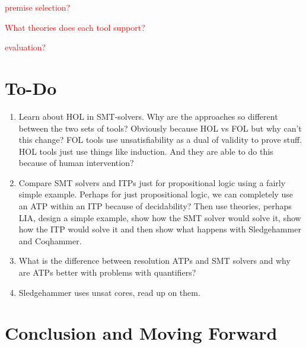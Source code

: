 \documentclass{article}
\begin{document}
	\textcolor{red}{premise selection?}
	
	\textcolor{red}{What theories does each tool support?}
	
	\textcolor{red}{evaluation?}
	
	
\section{To-Do}
	\begin{enumerate}
		\item Learn about HOL in SMT-solvers. Why are the approaches 
		so different between the two sets of tools? Obviously because
		HOL vs FOL but why can't this change? FOL tools use unsatisfiability 
		as a dual of validity to prove stuff. HOL tools just use 
		things like induction. And they are able to do this because
		of human intervention?
		\item Compare SMT solvers and ITPs just for propositional 
		logic using a fairly simple example. Perhaps for just propositional 
		logic, we can completely use an ATP within an ITP because 
		of decidability? Then use theories, perhaps LIA, design a simple
		example, show how the SMT solver would solve it, show how the 
		ITP would solve it and then show what happens with 
		Sledgehammer and Coqhammer.
		\item What is the difference between resolution ATPs and SMT 
		solvers and why are ATPs better with problems with quantifiers?
		\item Sledgehammer uses unsat cores, read up on them.
	\end{enumerate}
	
	
\section{Conclusion and Moving Forward}
\label{sec:conc}



\end{document}
